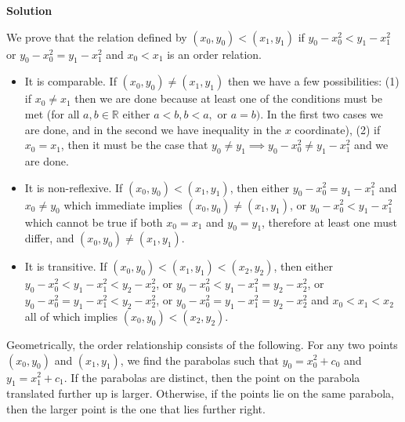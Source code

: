 \documentclass[12pt]{article}
\newcounter{AnswerCounter}
\newcounter{SubAnswerCounter}
\newenvironment{answer}[0]{
  \setcounter{SubAnswerCounter}{1}
  \bigskip
  \textbf{Solution \arabic{AnswerCounter}}
  \\
  \begin{small}
}{
  \end{small}
  \stepcounter{AnswerCounter}
}
\begin{document}
\begin{answer}
We prove that the relation defined by $(x_0,y_0) < (x_1,y_1)$ if $y_0 - x_0^2 < y_1 - x_1^2$ or $y_0 - x_0^2 = y_1 - x_1^2$ and $x_0 < x_1$ is an order relation.
\begin{itemize}
\item It is comparable. If $(x_0,y_0) \neq (x_1,y_1)$ then we have a few possibilities: (1) if $x_0 \neq x_1$ then we are done because at least one of the conditions must be met (for all $a,b \in \mathbb{R}$ either $a < b, b < a,$ or $a = b)$. In the first two cases we are done, and in the second we have inequality in the $x$ coordinate), (2) if $x_0 = x_1$, then it must be the case that $y_0 \neq y_1 \implies y_0 - x_0^2 \neq y_1 - x_1^2$ and we are done.
\item It is non-reflexive. If $(x_0,y_0) < (x_1,y_1)$, then either $y_0 - x_0^2 = y_1 - x_1^2$ and $x_0 \neq y_0$ which immediate implies $(x_0,y_0) \neq (x_1,y_1)$, or $y_0 - x_0^2 < y_1 -x_1^2$ which cannot be true if both $x_0 = x_1$ and $y_0 = y_1$, therefore at least one must differ, and $(x_0,y_0) \neq (x_1, y_1)$.
\item It is transitive. If $(x_0,y_0) < (x_1,y_1) < (x_2,y_2)$, then either $y_0 - x_0^2 < y_1 - x_1^2 < y_2 - x_2^2$, or $y_0 - x_0^2 < y_1 - x_1^2 = y_2 - x_2^2$, or $y_0 - x_0^2 = y_1 - x_1^2 < y_2 - x_2^2$, or $y_0 - x_0^2 = y_1 - x_1^2 = y_2 - x_2^2$ and $x_0 < x_1 < x_2$ all of which implies $(x_0,y_0) < (x_2,y_2)$.
\end{itemize}
Geometrically, the order relationship consists of the following. For any two points $(x_0,y_0)$ and $(x_1,y_1)$, we find the parabolas such that $y_0 = x_0^2 + c_0$ and $y_1 = x_1^2 + c_1$. If the parabolas are distinct, then the point on the parabola translated further up is larger. Otherwise, if the points lie on the same parabola, then the larger point is the one that lies further right.
\end{answer}
\end{document}

